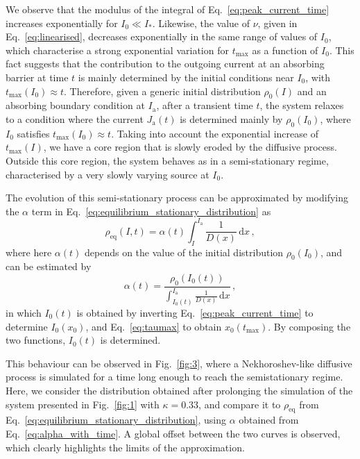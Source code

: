We observe that the modulus of the integral of Eq.~\eqref{eq:peak_current_time} increases exponentially for $I_0 \ll I_\ast$. Likewise, the value of $\nu$, given in Eq.~\eqref{eq:linearised}, decreases exponentially in the same range of values of $I_0$, which characterise a strong exponential variation for $t_\text{max}$ as a function of $I_0$. This fact suggests that the contribution to the outgoing current at an absorbing barrier at time $t$ is mainly determined by the initial conditions near $I_0$, with $t_\text{max}(I_0) \approx t$. Therefore, given a generic initial distribution $\rho_0(I)$ and an absorbing boundary condition at $I_\mathrm{a}$, after a transient time $t$, the system relaxes to a condition where the current $J_\mathrm{a}(t)$ is determined mainly by $\rho_0(I_0)$, where $I_0$ satisfies $t_\text{max}(I_0) \approx t$. Taking into account the exponential increase of $t_\text{max}(I)$, we have a core region that is slowly eroded by the diffusive process. Outside this core region, the system behaves as in a semi-stationary regime, characterised by a very slowly varying source at $I_0$.

The evolution of this semi-stationary process can be approximated by modifying the $\alpha$ term in Eq.~\eqref{eq:equilibrium_stationary_distribution} as
\begin{equation}
    \rho_\mathrm{eq}(I, t) = \alpha(t) \int_I^{I_\mathrm{a}} \frac{1}{D(x)}\,\mathrm{d}x\,,
    \label{eq:semi_stationary_distribution}
\end{equation}
where here $\alpha(t)$ depends on the value of the initial distribution $\rho_0(I_0)$, and can be estimated by
\begin{equation}
    \alpha(t) = \frac{\rho_0\left(I_0(t)\right)}{\displaystyle{ \int_{I_0(t)}^{I_\mathrm{a}} \frac{1}{D(x)}\,\mathrm{d}x}}\,,
    \label{eq:alpha_with_time}
\end{equation}
in which $I_0(t)$ is obtained by inverting Eq.~\eqref{eq:peak_current_time} to determine $I_0(x_0)$, and Eq.~\eqref{eq:taumax} to obtain $x_0(t_\mathrm{max})$. By composing the two functions, $I_0(t)$ is determined.

This behaviour can be observed in Fig.~\ref{fig:3}, where a Nekhoroshev-like diffusive process is simulated for a time long enough to reach the semistationary regime. Here, we consider the distribution obtained after prolonging the simulation of the system presented in Fig.~\ref{fig:1} with $\kappa=0.33$, and compare it to $\rho_\mathrm{eq}$ from Eq.~\eqref{eq:equilibrium_stationary_distribution}, using $\alpha$ obtained from Eq.~\eqref{eq:alpha_with_time}. A global offset between the two curves is observed, which clearly highlights the limits of the approximation. 

